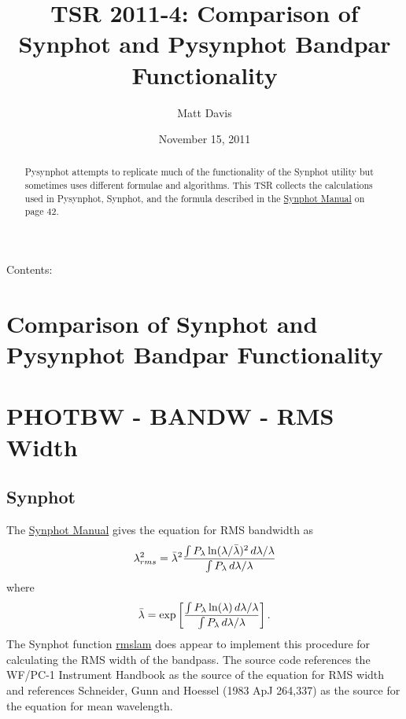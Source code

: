 \documentclass[letterpaper,10pt,english]{sphinxtsr}
\title{TSR 2011-4: Comparison of Synphot and Pysynphot Bandpar Functionality}
\date{November 15, 2011}
\author{Matt Davis}
\begin{document}
\maketitle
\tableofcontents
{}\label{index::doc}


Contents:


\chapter{Comparison of Synphot and Pysynphot Bandpar Functionality}
\label{main:comparison-of-synphot-and-pysynphot-bandpar-functionality}\label{main:tsr-2011-4-comparison-of-synphot-and-pysynphot-bandpar-functionality}\label{main::doc}
\begin{abstract}

Pysynphot attempts to replicate much of the functionality of the Synphot
 utility but sometimes uses different formulae and algorithms.
This TSR collects the calculations used in Pysynphot, Synphot, and the
formula described in the \href{http://stsdas.stsci.edu/stsci\_python\_epydoc/SynphotManual.pdf}{Synphot Manual} on page 42.

\end{abstract}


\chapter{PHOTBW - BANDW - RMS Width}
\label{main:synphot-manual}\label{main:photbw-bandw-rms-width}

\section{Synphot}
\label{main:synphot}
The \href{http://stsdas.stsci.edu/stsci\_python\_epydoc/SynphotManual.pdf}{Synphot Manual} gives the equation for RMS bandwidth as
\begin{gather}
\begin{split}\lambda_{rms}^2 = \bar{\lambda}^2 \frac{\int P_{\lambda} \ln(\lambda/\bar{\lambda})^2
\,d\lambda/\lambda}{\int P_{\lambda} \,d\lambda/\lambda}\end{split}\notag
\end{gather}
where
\begin{gather}
\begin{split}\bar{\lambda} = \exp \left[ \frac{\int P_{\lambda} \ln(\lambda) \,d\lambda/\lambda}
{\int P_{\lambda} \,d\lambda/\lambda} \right].\end{split}\notag
\end{gather}
The Synphot function \href{https://svn.stsci.edu/trac/ssb/stsci\_python/browser/stsdas/trunk/stsdas/lib/synphot/rmslam.x}{rmslam} does appear to implement this procedure for
calculating the RMS width of the bandpass. The source code references the WF/PC-1
Instrument Handbook as the source of the equation for RMS width and references
Schneider, Gunn and Hoessel (1983 ApJ 264,337) as the source for the equation
for mean wavelength.
\end{document}
